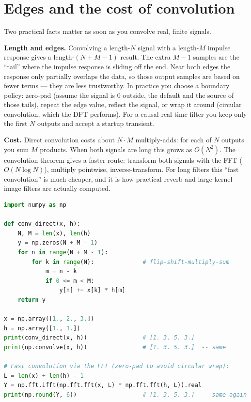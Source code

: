 \section{Edges and the cost of convolution}
\label{ch13:practical}

Two practical facts matter as soon as you convolve real, finite signals.

\textbf{Length and edges.} Convolving a length-$N$ signal with a length-$M$
impulse response gives a length-$(N+M-1)$ result. The extra $M-1$ samples are
the ``tail'' where the impulse response is sliding off the end. Near both edges
the response only partially overlaps the data, so those output samples are based
on fewer terms --- they are less trustworthy. In practice you choose a boundary
policy: zero-pad (assume the signal is $0$ outside, the default and the source of
those tails), repeat the edge value, reflect the signal, or wrap it around
(circular convolution, which the DFT performs). For a causal real-time filter
you keep only the first $N$ outputs and accept a startup transient.

\textbf{Cost.} Direct convolution costs about $N \cdot M$ multiply-adds: for
each of $N$ outputs you sum $M$ products. When both signals are long this grows as
$O(N^2)$. The convolution theorem gives a faster route: transform both signals
with the FFT ($O(N\log N)$), multiply pointwise, inverse-transform. For long
filters this ``fast convolution'' is much cheaper, and it is how practical
reverb and large-kernel image filters are actually computed.

\begin{lstlisting}[language=Python, caption={Discrete convolution three ways: by hand, with NumPy, and the FFT route.}]
import numpy as np

def conv_direct(x, h):
    N, M = len(x), len(h)
    y = np.zeros(N + M - 1)
    for n in range(N + M - 1):
        for k in range(N):              # flip-shift-multiply-sum
            m = n - k
            if 0 <= m < M:
                y[n] += x[k] * h[m]
    return y

x = np.array([1., 2., 3.])
h = np.array([1., 1.])
print(conv_direct(x, h))                # [1. 3. 5. 3.]
print(np.convolve(x, h))                # [1. 3. 5. 3.]  -- same

# Fast convolution via the FFT (zero-pad to avoid circular wrap):
L = len(x) + len(h) - 1
Y = np.fft.ifft(np.fft.fft(x, L) * np.fft.fft(h, L)).real
print(np.round(Y, 6))                   # [1. 3. 5. 3.]  -- same again
\end{lstlisting}

